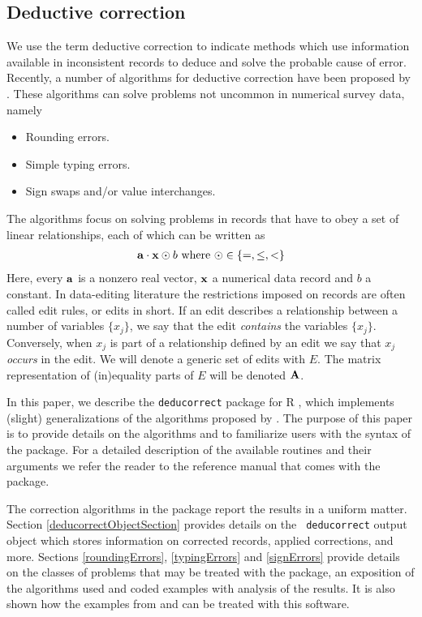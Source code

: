 \documentclass[11pt, fleqn, a4paper]{article}
\begin{document}
\subsection{Deductive correction}
We use the term deductive correction to indicate methods which use information
available in inconsistent records to deduce and solve the probable cause of
error. Recently, a number of algorithms for deductive correction have
been proposed by \cite{scholtus:2008, scholtus:2009}. These algorithms
can solve problems not uncommon in numerical survey data, namely
%
\begin{itemize}
\item Rounding errors.
\item Simple typing errors.
\item Sign swaps and/or value interchanges.
\end{itemize}
%
The algorithms focus on solving problems in records that have to
obey a set of linear relationships, each of which can be written as
%
\begin{eqnarray}
{\bf a}\cdot{\bf x} \odot b \textrm{ where } \odot \in\{=,\leq,<\}
\label{edit}
\end{eqnarray}
%
Here, every $\bf a$ is a nonzero real vector, $\bf x$ a numerical data record and $b$ 
a constant. In data-editing literature the restrictions imposed on records are
often called edit rules, or edits in short. If an edit describes a relationship
between a number of variables $\{x_j\}$, we say that the edit {\em contains}
the variables $\{x_j\}$. Conversely, when $x_j$ is part of a relationship
defined by an edit we say that $x_j$ {\em occurs} in the edit. We will denote
a generic set of edits with $E$. The matrix representation of (in)equality parts
of $E$ will be denoted $\bf{A}$.


In this paper, we describe the {\tt deducorrect} package for R
\citep{R-core:2011}, which implements (slight) generalizations of the
algorithms proposed by \cite{scholtus:2008, scholtus:2009}. The purpose of this
paper is to provide details on the algorithms and to familiarize users with the
syntax of the package. For a detailed description of the available routines and
their arguments we refer the reader to the reference manual that comes with the
package.

The correction algorithms in the package report the results in a uniform
matter. Section \ref{deducorrectObjectSection} provides details on the {\tt
deducorrect} output object which stores information on corrected records,
applied corrections, and more. Sections \ref{roundingErrors},
\ref{typingErrors} and \ref{signErrors} provide details on the classes of
problems that may be treated with the package, an exposition of the algorithms
used and coded examples with analysis of the results. It is also shown how the
examples from \cite{scholtus:2008} and \cite{scholtus:2009} can be treated with
this software. 
\end{document}
